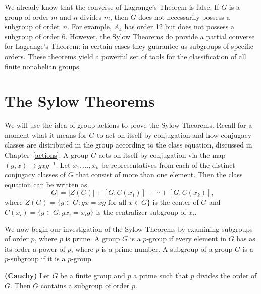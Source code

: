  
We already know that the converse of Lagrange's Theorem is false.  If $G$ is a group of order $m$ and $n$ divides $m$, then $G$ does not necessarily possess a subgroup of order~$n$.  For example, $A_4$ has order 12 but does not possess a subgroup of order 6.  However, the Sylow Theorems do provide a partial converse for Lagrange's Theorem: in certain cases they guarantee us subgroups of specific orders.  These theorems yield a powerful set of tools for the classification of all finite nonabelian groups.  

 
\section{The Sylow Theorems}

We will use the idea of  group actions to prove the Sylow Theorems.  Recall for a moment what it means for $G$ to act on itself by conjugation and how conjugacy classes are distributed in the group according to the class equation, discussed in Chapter~\ref{actions}.   A group  $G$ acts on itself by conjugation via the map $(g,x) \mapsto gxg^{-1}$. Let $x_1, \ldots, x_k$ be representatives from each  of the distinct conjugacy classes of $G$ that consist of more than one element. Then the class equation can be written as 
\[
|G| = |Z(G)| + [G: C(x_1) ] + \cdots + [ G: C(x_k)],
\]
where $Z(G) = \{g \in G : gx = xg \text{ for all } x \in G\}$ is the center of $G$ and  $C(x_i) = \{ g \in G : g x_i = x_i g \}$ is the centralizer subgroup of $x_i$.
 
We now begin our investigation of the Sylow Theorems by examining subgroups of order $p$, where $p$ is prime.  A group $G$ is a {\bfi $p$-group\/} if every element in $G$ has as
its order a power of $p$, where $p$ is a prime number. A subgroup of a group $G$ is a {\bfi $p$-subgroup\/} if it is a  $p$-group.  
 
\begin{theorem} {\bf (Cauchy)}
Let $G$ be a finite group and $p$ a prime such that $p$ divides the
order of $G$. Then $G$ contains a subgroup of order $p$.
\end{theorem}
 
